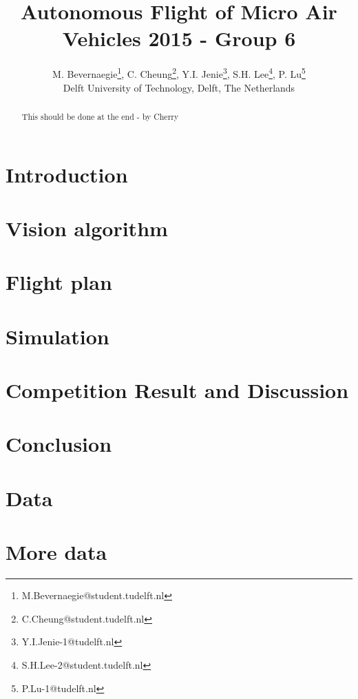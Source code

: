 \documentclass{article}
\title{Autonomous Flight of Micro Air Vehicles 2015 - Group 6}
\author{M. Bevernaegie\thanks{M.Bevernaegie@student.tudelft.nl}, C. Cheung\thanks{C.Cheung@student.tudelft.nl}, Y.I. Jenie\thanks{Y.I.Jenie-1@tudelft.nl}, S.H. Lee\thanks{S.H.Lee-2@student.tudelft.nl}, P. Lu\thanks{P.Lu-1@tudelft.nl} \\ Delft University of Technology, Delft, The Netherlands}
\begin{document}
\maketitle

\begin{abstract}
{\color{red} This should be done at the end - by Cherry}


\end{abstract}

\section{Introduction} \label{section:introduction}



\section{Vision algorithm}



\section{Flight plan}




\section{Simulation}
\label{section:simulation}



\section{Competition Result and Discussion}

\section{Conclusion}





\appendix
\newcommand{\appsection}[1]{\let\oldthesection\thesection
  \renewcommand{\thesection}{Appendix \oldthesection:}
  \section{#1}\let\thesection\oldthesection}

\appsection{Data}
\appsection{More data}
\end{document}
